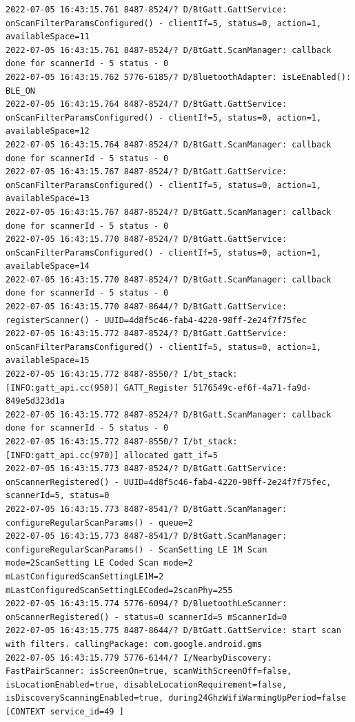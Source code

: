\documentclass[a4paper,12pt]{book}
\begin{document}
\begin{lstlisting}
2022-07-05 16:43:15.761 8487-8524/? D/BtGatt.GattService: onScanFilterParamsConfigured() - clientIf=5, status=0, action=1, availableSpace=11
2022-07-05 16:43:15.761 8487-8524/? D/BtGatt.ScanManager: callback done for scannerId - 5 status - 0
2022-07-05 16:43:15.762 5776-6185/? D/BluetoothAdapter: isLeEnabled(): BLE_ON
2022-07-05 16:43:15.764 8487-8524/? D/BtGatt.GattService: onScanFilterParamsConfigured() - clientIf=5, status=0, action=1, availableSpace=12
2022-07-05 16:43:15.764 8487-8524/? D/BtGatt.ScanManager: callback done for scannerId - 5 status - 0
2022-07-05 16:43:15.767 8487-8524/? D/BtGatt.GattService: onScanFilterParamsConfigured() - clientIf=5, status=0, action=1, availableSpace=13
2022-07-05 16:43:15.767 8487-8524/? D/BtGatt.ScanManager: callback done for scannerId - 5 status - 0
2022-07-05 16:43:15.770 8487-8524/? D/BtGatt.GattService: onScanFilterParamsConfigured() - clientIf=5, status=0, action=1, availableSpace=14
2022-07-05 16:43:15.770 8487-8524/? D/BtGatt.ScanManager: callback done for scannerId - 5 status - 0
2022-07-05 16:43:15.770 8487-8644/? D/BtGatt.GattService: registerScanner() - UUID=4d8f5c46-fab4-4220-98ff-2e24f7f75fec
2022-07-05 16:43:15.772 8487-8524/? D/BtGatt.GattService: onScanFilterParamsConfigured() - clientIf=5, status=0, action=1, availableSpace=15
2022-07-05 16:43:15.772 8487-8550/? I/bt_stack: [INFO:gatt_api.cc(950)] GATT_Register 5176549c-ef6f-4a71-fa9d-849e5d323d1a
2022-07-05 16:43:15.772 8487-8524/? D/BtGatt.ScanManager: callback done for scannerId - 5 status - 0
2022-07-05 16:43:15.772 8487-8550/? I/bt_stack: [INFO:gatt_api.cc(970)] allocated gatt_if=5
2022-07-05 16:43:15.773 8487-8524/? D/BtGatt.GattService: onScannerRegistered() - UUID=4d8f5c46-fab4-4220-98ff-2e24f7f75fec, scannerId=5, status=0
2022-07-05 16:43:15.773 8487-8541/? D/BtGatt.ScanManager: configureRegularScanParams() - queue=2
2022-07-05 16:43:15.773 8487-8541/? D/BtGatt.ScanManager: configureRegularScanParams() - ScanSetting LE 1M Scan mode=2ScanSetting LE Coded Scan mode=2 mLastConfiguredScanSettingLE1M=2 mLastConfiguredScanSettingLECoded=2scanPhy=255
2022-07-05 16:43:15.774 5776-6094/? D/BluetoothLeScanner: onScannerRegistered() - status=0 scannerId=5 mScannerId=0
2022-07-05 16:43:15.775 8487-8644/? D/BtGatt.GattService: start scan with filters. callingPackage: com.google.android.gms
2022-07-05 16:43:15.779 5776-6144/? I/NearbyDiscovery: FastPairScanner: isScreenOn=true, scanWithScreenOff=false, isLocationEnabled=true, disableLocationRequirement=false, isDiscoveryScanningEnabled=true, during24GhzWifiWarmingUpPeriod=false [CONTEXT service_id=49 ]

\end{lstlisting}
\end{document}

